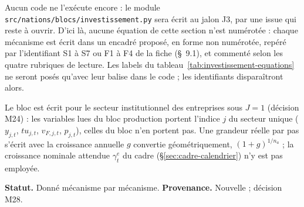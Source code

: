 \documentclass[11pt,a4paper]{article}
\begin{document}
\begin{proposee}
Aucun code ne l'exécute encore : le module \nolinkurl{src/nations/blocs/investissement.py} sera écrit au jalon J3, par une issue qui reste à ouvrir. D'ici là, aucune équation de cette section n'est numérotée : chaque mécanisme est écrit dans un encadré proposé, en forme non numérotée, repéré par l'identifiant S1 à S7 ou F1 à F4 de la fiche (\S~9.1), et commenté selon les quatre rubriques de lecture. Les labels du tableau~\ref{tab:investissement-equations} ne seront posés qu'avec leur balise dans le code ; les identifiants disparaîtront alors.

Le bloc est écrit pour le secteur institutionnel des entreprises sous $J = 1$ (décision M24) : les variables lues du bloc production portent l'indice $j$ du secteur unique ($y_{j,t}$, $\mathit{tu}_{j,t}$, $v_{F,j,t}$, $p_{j,t}$), celles du bloc n'en portent pas. Une grandeur réelle par pas s'écrit avec la croissance annuelle $g$ convertie géométriquement, $(1 + g)^{1/n_a}$ ; la croissance nominale attendue $\gamma^e_t$ du cadre (\S\ref{sec:cadre-calendrier}) n'y est pas employée.

\textbf{Statut.} Donné mécanisme par mécanisme. \textbf{Provenance.} Nouvelle ; décision M28.
\end{proposee}
\end{document}
